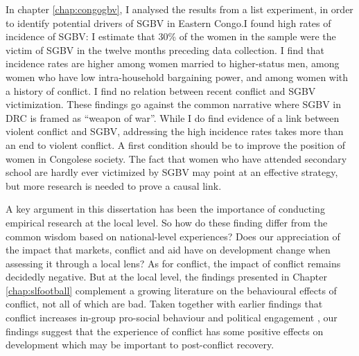 In chapter \ref{chap:congogbv}, I analysed the results from a list experiment, in order to identify potential drivers {}of SGBV in Eastern Congo.I found high rates of incidence of SGBV: I estimate that 30\% of the women in the sample were the victim of SGBV in the twelve months preceding data collection. I find that incidence rates are higher among women married to higher-status men, among women who have low intra-household bargaining power, and among women with a history of conflict. I find no relation between recent conflict and SGBV victimization. These findings go against the common narrative where SGBV in DRC is framed as ``weapon of war''. While I do find evidence of a link between violent conflict and SGBV, addressing the high incidence rates takes more than an end to violent conflict. A first condition should be to improve the position of women in Congolese society. The fact that women who have attended secondary school are hardly ever victimized by SGBV may point at an effective strategy, but more research is needed to prove a causal link.

A key argument in this dissertation has been the importance of conducting empirical research at the local level. So how do these finding differ from the common wisdom based on national-level experiences? Does our appreciation of the impact that markets, conflict and aid have on development change when assessing it through a local lens? As for conflict, the impact of conflict remains decidedly negative. But at the local level, the findings presented in Chapter \ref{chap:slfootball} complement a growing literature on the behavioural effects of conflict, not all of which are bad. Taken together with earlier findings that conflict increases in-group pro-social behaviour \cite{Bellows2009b,Voors2012,Gilligan2014,Bauer2014} and political engagement \cite{Bellows2009b,Blattman2009a}, our findings suggest that the experience of conflict has some positive effects on development which may be important to post-conflict recovery.

